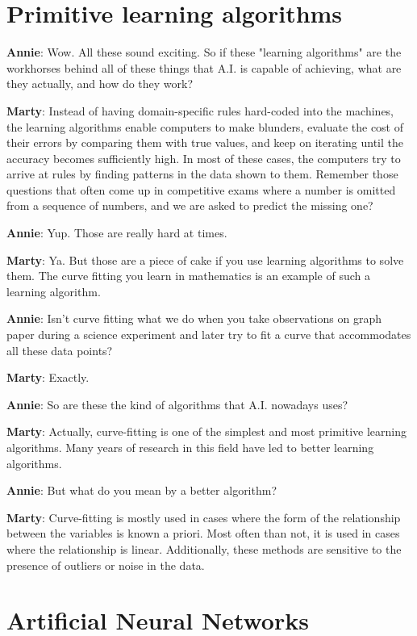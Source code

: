 \documentclass{../template/texnote}
\begin{document}
\section{Primitive learning algorithms}
\noindent


\textbf{Annie}: Wow. All these sound exciting. So if these "learning algorithms"  are the workhorses behind all of these things that A.I. is capable of achieving, what are they actually, and how do they work?

\textbf{Marty}: Instead of having domain-specific rules hard-coded into the machines, the learning algorithms enable computers to make blunders, evaluate the cost of their errors by comparing them with true values, and keep on iterating until the accuracy becomes sufficiently high. In most of these cases, the computers try to arrive at rules by finding patterns in the data shown to them. Remember those questions that often come up in competitive exams where a number is omitted from a sequence of numbers, and we are asked to predict the missing one?

\textbf{Annie}: Yup. Those are really hard at times. 

\textbf{Marty}: Ya. But those are a piece of cake if you use learning algorithms to solve them. The curve fitting you learn in mathematics is an example of such a learning algorithm. 

\textbf{Annie}: Isn't curve fitting what we do when you take observations on graph paper during a science experiment and later try to fit a curve that accommodates all these data points?

\textbf{Marty}: Exactly. 

\textbf{Annie}: So are these the kind of algorithms that A.I. nowadays uses?

\textbf{Marty}: Actually, curve-fitting is one of the simplest and most primitive learning algorithms. Many years of research in this field have led to better learning algorithms. 

\textbf{Annie}: But what do you mean by a better algorithm?

\textbf{Marty}: Curve-fitting is mostly used in cases where the form of the relationship between the variables is known a priori. Most often than not, it is used in cases where the relationship is linear. Additionally, these methods are sensitive to the presence of outliers or noise in the data. 

\section{Artificial Neural Networks}
\noindent
\end{document}
